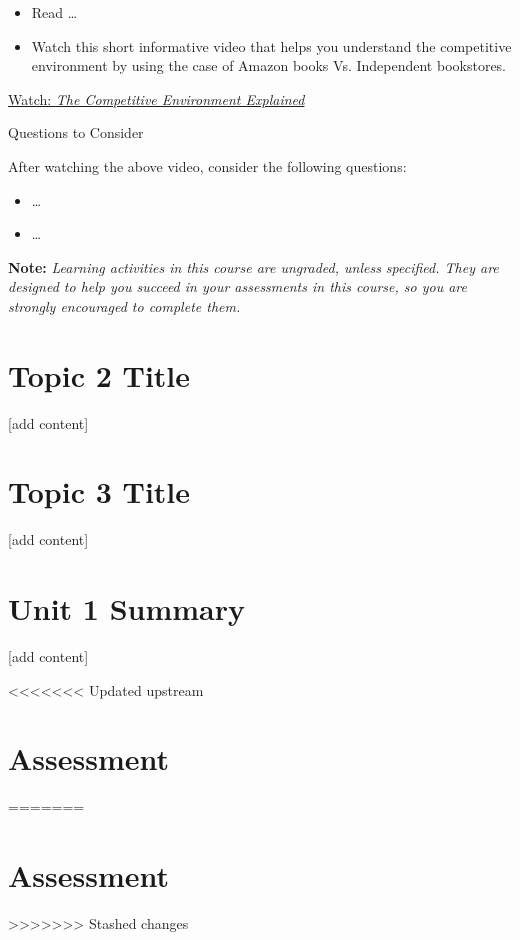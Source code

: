 \documentclass[
]{book}
\providecommand{\tightlist}{%
  \setlength{\itemsep}{0pt}\setlength{\parskip}{0pt}}
\begin{document}
\begin{reflect}
\begin{itemize}
\tightlist
\item
  Read \ldots{}\\
\item
  Watch this short informative video that helps you understand the competitive environment by using the case of Amazon books Vs. Independent bookstores.
\end{itemize}

\href{https://www.youtube.com/watch?v=XIt7dEmo4D8}{Watch: \emph{The Competitive Environment Explained}}

Questions to Consider

After watching the above video, consider the following questions:

\begin{itemize}
\tightlist
\item
  \ldots{}\\
\item
  \ldots{}
\end{itemize}

\textbf{Note:} \emph{Learning activities in this course are ungraded, unless specified. They are designed to help you succeed in your assessments in this course, so you are strongly encouraged to complete them.}
\end{reflect}

\hypertarget{topic-2-title}{%
\section{Topic 2 Title}\label{topic-2-title}}

{[}add content{]}

\hypertarget{topic-3-title}{%
\section{Topic 3 Title}\label{topic-3-title}}

{[}add content{]}

\hypertarget{unit-1-summary}{%
\section*{Unit 1 Summary}\label{unit-1-summary}}

{[}add content{]}

<<<<<<< Updated upstream
\hypertarget{assessment-13}{%
\section*{Assessment}\label{assessment-13}}
=======
\hypertarget{assessment-12}{%
\section*{Assessment}\label{assessment-12}}
>>>>>>> Stashed changes
\end{document}
